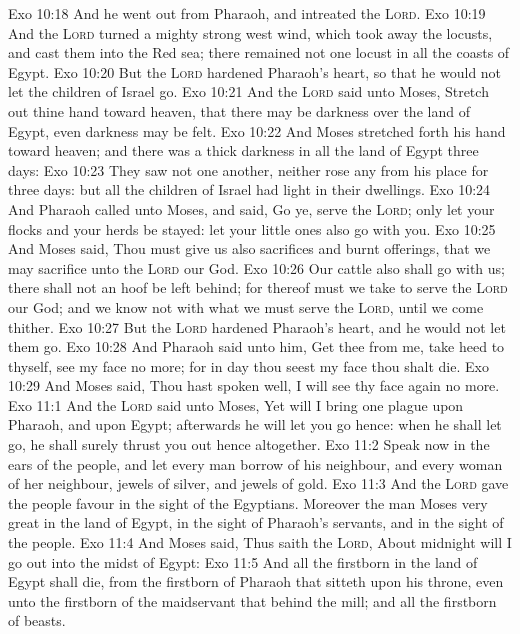 \vs Exo 10:18 And he went out from Pharaoh, and intreated the \textsc{Lord}.
\vs Exo 10:19 And the \textsc{Lord} turned a mighty strong west wind, which took away the locusts, and cast them into the Red sea; there remained not one locust in all the coasts of Egypt.
\vs Exo 10:20 But the \textsc{Lord} hardened Pharaoh's heart, so that he would not let the children of Israel go.
\vs Exo 10:21 And the \textsc{Lord} said unto Moses, Stretch out thine hand toward heaven, that there may be darkness over the land of Egypt, even darkness  may be felt.
\vs Exo 10:22 And Moses stretched forth his hand toward heaven; and there was a thick darkness in all the land of Egypt three days:
\vs Exo 10:23 They saw not one another, neither rose any from his place for three days: but all the children of Israel had light in their dwellings.
\vs Exo 10:24 And Pharaoh called unto Moses, and said, Go ye, serve the \textsc{Lord}; only let your flocks and your herds be stayed: let your little ones also go with you.
\vs Exo 10:25 And Moses said, Thou must give us also sacrifices and burnt offerings, that we may sacrifice unto the \textsc{Lord} our God.
\vs Exo 10:26 Our cattle also shall go with us; there shall not an hoof be left behind; for thereof must we take to serve the \textsc{Lord} our God; and we know not with what we must serve the \textsc{Lord}, until we come thither.
\vs Exo 10:27 But the \textsc{Lord} hardened Pharaoh's heart, and he would not let them go.
\vs Exo 10:28 And Pharaoh said unto him, Get thee from me, take heed to thyself, see my face no more; for in  day thou seest my face thou shalt die.
\vs Exo 10:29 And Moses said, Thou hast spoken well, I will see thy face again no more.
\vs Exo 11:1 And the \textsc{Lord} said unto Moses, Yet will I bring one plague  upon Pharaoh, and upon Egypt; afterwards he will let you go hence: when he shall let  go, he shall surely thrust you out hence altogether.
\vs Exo 11:2 Speak now in the ears of the people, and let every man borrow of his neighbour, and every woman of her neighbour, jewels of silver, and jewels of gold.
\vs Exo 11:3 And the \textsc{Lord} gave the people favour in the sight of the Egyptians. Moreover the man Moses  very great in the land of Egypt, in the sight of Pharaoh's servants, and in the sight of the people.
\vs Exo 11:4 And Moses said, Thus saith the \textsc{Lord}, About midnight will I go out into the midst of Egypt:
\vs Exo 11:5 And all the firstborn in the land of Egypt shall die, from the firstborn of Pharaoh that sitteth upon his throne, even unto the firstborn of the maidservant that  behind the mill; and all the firstborn of beasts.
